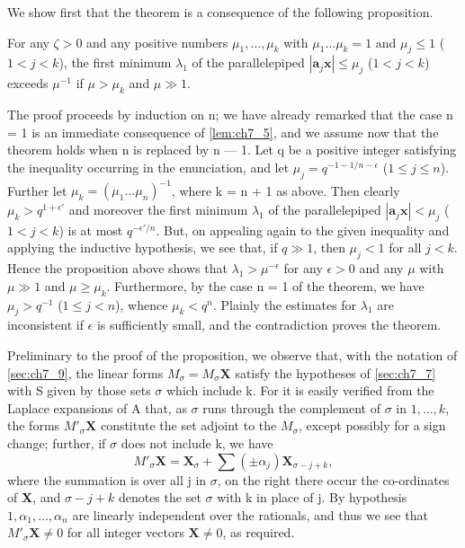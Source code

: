 We show first that the theorem is a consequence of the following proposition.

For any $\zeta > 0$ and any positive numbers $\mu_1, \dots, \mu_k$ with $\mu_1 \dots \mu_k = 1$ and $\mu_j \le 1$ ($1 < j < k$), the first minimum $\lambda_1$ of the parallelepiped $|\mathbf{a}_j \mathbf{x}| \le \mu_j$ ($1 < j < k$) exceeds $\mu^{-1}$ if $\mu > \mu_k$ and $\mu \gg 1$.

The proof proceeds by induction on n; we have already remarked that the case n = 1 is an immediate consequence of \autoref{lem:ch7_5}, and we assume now that the theorem holds when n is replaced by n — 1. Let q be a positive integer satisfying the inequality occurring in the enunciation, and let $\mu_j = q^{-1-1/n-\epsilon}$ ($1 \le j \le n$). Further let $\mu_k = (\mu_1 \dots \mu_n)^{-1}$, where k = n + 1 as above. Then clearly $\mu_k > q^{1+\epsilon'}$ and moreover the first minimum $\lambda_1$ of the parallelepiped $|\mathbf{a}_j \mathbf{x}| < \mu_j$ ($1 < j < k$) is at most $q^{-\epsilon'/n}$. But, on appealing again to the given inequality and applying the inductive hypothesis, we see that, if $q \gg 1$, then $\mu_j < 1$ for all $j < k$. Hence the proposition above shows that $\lambda_1 > \mu^{-\epsilon}$ for any $\epsilon > 0$ and any $\mu$ with $\mu \gg 1$ and $\mu \ge \mu_k$. Furthermore, by the case n = 1 of the theorem, we have $\mu_j > q^{-1}$ ($1 \leqslant j < n$), whence $\mu_k < q^n$. Plainly the estimates for $\lambda_1$ are inconsistent if $\epsilon$ is sufficiently small, and the contradiction proves the theorem.

Preliminary to the proof of the proposition, 
we observe that, with the notation of \autoref{sec:ch7_9}, the linear forms $M_\sigma = M_\sigma \mathbf{X}$ satisfy the hypotheses of \autoref{sec:ch7_7} with S given by those sets $\sigma$ which include k. For it is easily verified from the Laplace expansions of A that, as $\sigma$ runs through the complement of $\sigma$ in $1, \dots, k$, the forms $M'_\sigma \mathbf{X}$ constitute the set adjoint to the $M_\sigma$, except possibly for a sign change; further, if $\sigma$ does not include k, we have
\[M'_\sigma \mathbf{X} = \mathbf{X}_\sigma + \sum ( \pm \alpha_j ) \mathbf{X}_{\sigma-j+k},\]
where the summation is over all j in $\sigma$, on the right there occur the co-ordinates of \textbf{X}, and $\sigma-j+k$ denotes the set $\sigma$ with k in place of j. By hypothesis $1, \alpha_1, \dots, \alpha_n$ are linearly independent over the rationals, and thus we see that $M'_\sigma \mathbf{X} \neq 0$ for all integer vectors $\mathbf{X} \neq 0$, as required.

